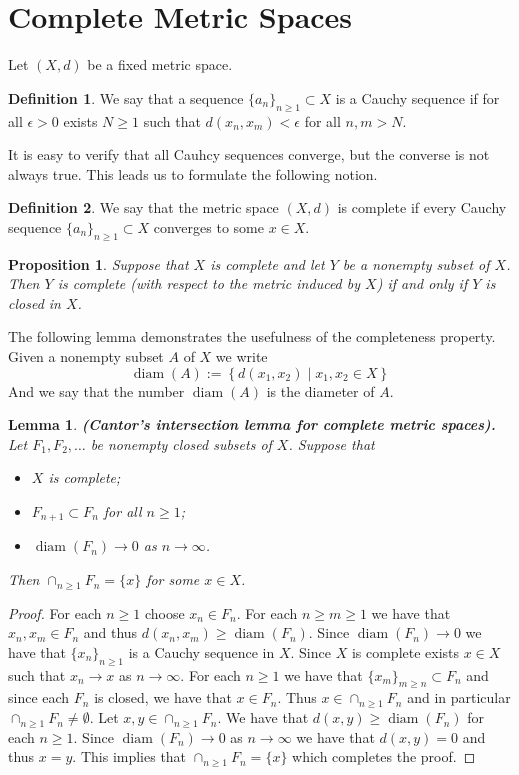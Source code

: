 \documentclass[11pt,a4paper]{article}
\theoremstyle{definition}
\newtheorem{definition}{Definition}[section]
\theoremstyle{plain}
\newtheorem{proposition}[theorem]{Proposition}
\newtheorem{lemma}[theorem]{Lemma}
\DeclareMathOperator{\diam}{diam}
\newcommand{\set}[2]{ \left\{ #1 \mid #2 \right\} }
\renewcommand{\tt}[1]{\textnormal{\textbf{(#1).}}} %
\begin{document}
	\section{Complete Metric Spaces}
	Let $(X,d)$ be a fixed metric space.
	\begin{definition}
		We say that a sequence $\{a_n\}_{n \geq 1} \subset X$ is a Cauchy
		sequence if for all $\epsilon > 0$ exists $N \geq 1$ such that 
		$d(x_n,x_m) < \epsilon$ for all $n,m > N$.
	\end{definition}
	It is easy to verify that all Cauhcy sequences converge, but the converse
	is not always true. This leads us to formulate the following notion.
	\begin{definition}
		We say that the metric space $(X,d)$ is complete if every Cauchy
		sequence $\{a_n\}_{n \geq 1} \subset X$ converges to some $x \in X$.
	\end{definition}
	\begin{proposition}
		Suppose that $X$ is complete and let $Y$ be a nonempty subset of $X$. 
		Then $Y$ is complete (with respect to the metric induced by $X$) if and 
		only if $Y$ is closed in $X$.
	\end{proposition}
	The following lemma demonstrates the usefulness of the completeness property.
	Given a nonempty subset $A$ of $X$ we write
	\[
		\diam(A) := \set{d(x_1,x_2)}{x_1,x_2 \in X}
	\]
	And we say that the number $\diam(A)$ is the diameter of $A$.
	\begin{lemma}
		\tt{Cantor’s intersection lemma for complete metric spaces}
		Let $F_1,F_2,\dots$ be nonempty closed subsets of $X$. Suppose that
		\begin{itemize}
			\item $X$ is complete;
			\item $F_{n+1} \subset F_{n}$ for all $n \geq 1$;
			\item $\diam(F_n) \to 0$ as $n \to \infty$.
		\end{itemize}
		Then $\cap_{n \geq 1}{F_n} = \{x\}$ for some $x \in X$.
	\end{lemma}
	\begin{proof}
		For each $n \geq 1$ choose $x_n \in F_n$. For each $n \geq m \geq 1$
		we have that $x_n,x_m \in F_n$ and thus $d(x_n,x_m) \geq \diam(F_n)$.
		Since $\diam(F_n) \to 0$ we have that $\{x_n\}_{n \geq 1}$ is a Cauchy
		sequence in $X$. Since $X$ is complete exists $x \in X$ such that 
		$x_n \to x$ as $n \to \infty$. For each $n \geq 1$ we have that 
		$\{x_m\}_{m \geq n} \subset F_n$ and since each $F_n$ is closed, we
		have that $x \in F_n$. Thus $x \in \cap_{n \geq 1}{F_n}$ and in 
		particular $\cap_{n \geq 1}{F_n} \neq \emptyset$. Let 
		$x,y \in \cap_{n \geq 1}{F_n}$. We have that $d(x,y) \geq \diam(F_n)$
		for each $n \geq 1$. Since $\diam(F_n) \to 0$ as $n \to \infty$ we
		have that $d(x,y) = 0$ and thus $x=y$. This implies that
		$\cap_{n \geq 1}{F_n} = \{x\}$ which completes the proof.
	\end{proof}
\end{document}
